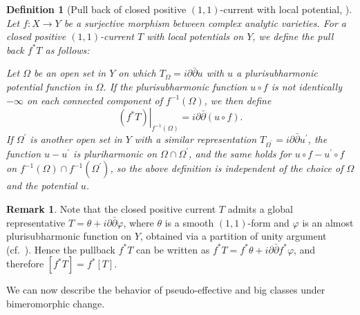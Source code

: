 \documentclass[12pt]{amsart}
\numberwithin{equation}{section}
\theoremstyle{definition}
\theoremstyle{plain}
\newtheorem{definition}  [theorem]     {Definition}
\newtheorem*{thm A*}{Theorem A}
\newtheorem*{thm B*}{Theorem B}
\newtheorem*{thm C*}{Theorem C}
\newtheorem*{thm D*}{Theorem D}
\theoremstyle{definition}
\newtheorem{remark}  [theorem]     {Remark}
\renewcommand{\1}{\mathds{1}}
\renewcommand{\>}{\rightarrow}
\begin{document}
\begin{definition}[{Pull back of closed positive $(1,1)$-current with local potential, \cite[Section 3.1]{Meo96}}]\label{Def: pullcurrent}
Let $f: X \rightarrow Y$ be a  surjective morphism between complex analytic varieties. For a closed positive $(1,1)$-current $T$ with local potentials on $Y$, we define the pull back $f^* T$ as follows:

Let $\Omega$ be an open set in $Y$ on which $T_{\Omega}=i \partial \bar{\partial} u$ with $u$ a plurisubharmonic potential function in $\Omega$. If the plurisubharmonic function $u \circ f$ is not identically $-\infty$ on each connected component of $f^{-1}(\Omega)$, we then define $$\left.\left(f^* T\right)\right|_{f^{-1}(\Omega)}=i \partial \bar{\partial}(u \circ f).$$If $\Omega^{\prime}$ is another open set in $Y$ with a similar representation $T_{\Omega^{\prime}}=i \partial \bar{\partial} u^{\prime}$, the function $u-u^{\prime}$ is pluriharmonic on $\Omega \cap \Omega^{\prime}$, and the same holds for $u \circ f-u^{\prime} \circ f$ on $f^{-1}(\Omega) \cap f^{-1}\left(\Omega^{\prime}\right)$, so the above definition is independent of the choice of $\Omega$ and the potential $u$.
\end{definition}
\begin{remark}\label{Rmk: Globalpull}
Note that the closed positive current $T$ admits a global representative 
$T = \theta + i \partial \bar{\partial} \varphi$, where $\theta$ is a smooth $(1,1)$-form and $\varphi$ is an almost plurisubharmonic function on $Y$, obtained via a partition of unity argument (cf.~\cite[Proposition 3.1.1]{Meo96}). Hence the pullback $f^*T$ can be written as 
$f^*T = f^*\theta + i \partial \bar{\partial} f^*\varphi$, and therefore $[f^*T] = f^*[T]$.
\end{remark}

We can now describe the behavior of pseudo-effective and big classes under bimeromorphic change.
\end{document}
